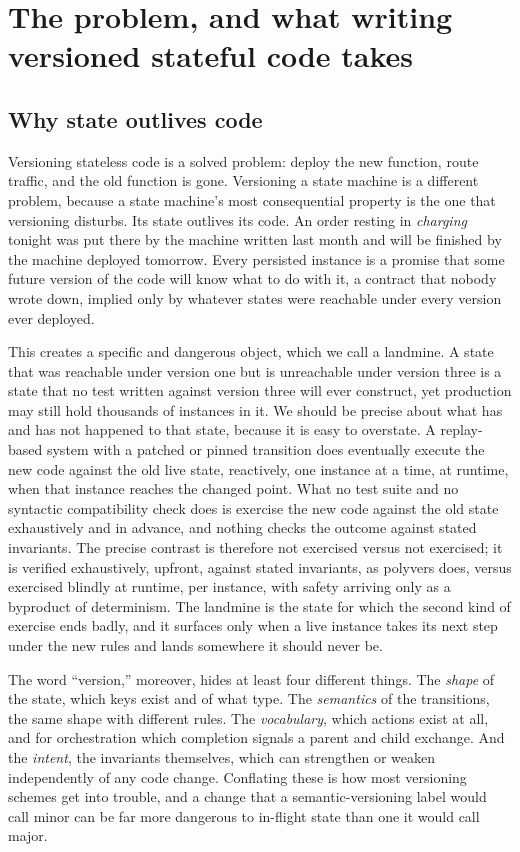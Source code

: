 \documentclass[11pt]{article}
\newcommand{\tool}[1]{\textsf{#1}}
\begin{document}
\section{The problem, and what writing versioned stateful code takes}

\subsection{Why state outlives code}

Versioning stateless code is a solved problem: deploy the new function, route
traffic, and the old function is gone. Versioning a state machine is a
different problem, because a state machine's most consequential property is the
one that versioning disturbs. Its state outlives its code. An order resting in
\emph{charging} tonight was put there by the machine written last month and
will be finished by the machine deployed tomorrow. Every persisted instance is
a promise that some future version of the code will know what to do with it, a
contract that nobody wrote down, implied only by whatever states were reachable
under every version ever deployed.

This creates a specific and dangerous object, which we call a landmine. A state
that was reachable under version one but is unreachable under version three is a
state that no test written against version three will ever construct, yet
production may still hold thousands of instances in it. We should be precise
about what has and has not happened to that state, because it is easy to
overstate. A replay-based system with a patched or pinned transition does
eventually execute the new code against the old live state, reactively, one
instance at a time, at runtime, when that instance reaches the changed point.
What no test suite and no syntactic compatibility check does is exercise the new
code against the old state exhaustively and in advance, and nothing checks the
outcome against stated invariants. The precise contrast is therefore not
exercised versus not exercised; it is verified exhaustively, upfront, against
stated invariants, as \tool{polyvers} does, versus exercised blindly at runtime,
per instance, with safety arriving only as a byproduct of determinism. The
landmine is the state for which the second kind of exercise ends badly, and it
surfaces only when a live instance takes its next step under the new rules and
lands somewhere it should never be.

The word ``version,'' moreover, hides at least four different things. The
\emph{shape} of the state, which keys exist and of what type. The
\emph{semantics} of the transitions, the same shape with different rules. The
\emph{vocabulary}, which actions exist at all, and for orchestration which
completion signals a parent and child exchange. And the \emph{intent}, the
invariants themselves, which can strengthen or weaken independently of any code
change. Conflating these is how most versioning schemes get into trouble, and a
change that a semantic-versioning label would call minor can be far more
dangerous to in-flight state than one it would call major.
\end{document}
